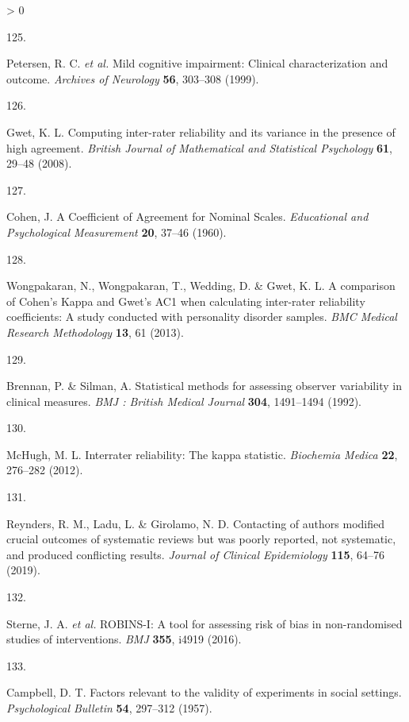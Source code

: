 \documentclass[a4paper, twoside]{templates/ociamthesis}
\newlength{\cslhangindent}
\newlength{\csllabelwidth}
\newenvironment{CSLReferences}[3] %
 {%
  \setlength{\parindent}{0pt}
  \ifodd #1 \everypar{\setlength{\hangindent}{\cslhangindent}}\ignorespaces\fi
  \ifnum #2 > 0
  \setlength{\parskip}{#2\baselineskip}
  \fi
 }%
 {}
\newcommand{\CSLLeftMargin}[1]{\parbox[t]{\maxof{\widthof{#1}}{\csllabelwidth}}{#1}}
\newcommand{\CSLRightInline}[1]{\parbox[t]{\linewidth - \csllabelwidth}{#1}}
\begin{document}
\begin{CSLReferences}{0}{0}
\leavevmode\hypertarget{ref-petersen1999}{}%
\CSLLeftMargin{125. }
\CSLRightInline{Petersen, R. C. \emph{et al.} Mild cognitive impairment: Clinical characterization and outcome. \emph{Archives of Neurology} \textbf{56}, 303--308 (1999).}

\leavevmode\hypertarget{ref-gwet2008}{}%
\CSLLeftMargin{126. }
\CSLRightInline{Gwet, K. L. Computing inter-rater reliability and its variance in the presence of high agreement. \emph{British Journal of Mathematical and Statistical Psychology} \textbf{61}, 29--48 (2008).}

\leavevmode\hypertarget{ref-cohen1960}{}%
\CSLLeftMargin{127. }
\CSLRightInline{Cohen, J. A {Coefficient} of {Agreement} for {Nominal Scales}. \emph{Educational and Psychological Measurement} \textbf{20}, 37--46 (1960).}

\leavevmode\hypertarget{ref-wongpakaran2013}{}%
\CSLLeftMargin{128. }
\CSLRightInline{Wongpakaran, N., Wongpakaran, T., Wedding, D. \& Gwet, K. L. A comparison of {Cohen}'s {Kappa} and {Gwet}'s {AC1} when calculating inter-rater reliability coefficients: A study conducted with personality disorder samples. \emph{BMC Medical Research Methodology} \textbf{13}, 61 (2013).}

\leavevmode\hypertarget{ref-brennan1992}{}%
\CSLLeftMargin{129. }
\CSLRightInline{Brennan, P. \& Silman, A. Statistical methods for assessing observer variability in clinical measures. \emph{BMJ : British Medical Journal} \textbf{304}, 1491--1494 (1992).}

\leavevmode\hypertarget{ref-mchugh2012}{}%
\CSLLeftMargin{130. }
\CSLRightInline{McHugh, M. L. Interrater reliability: The kappa statistic. \emph{Biochemia Medica} \textbf{22}, 276--282 (2012).}

\leavevmode\hypertarget{ref-reynders2019}{}%
\CSLLeftMargin{131. }
\CSLRightInline{Reynders, R. M., Ladu, L. \& Girolamo, N. D. Contacting of authors modified crucial outcomes of systematic reviews but was poorly reported, not systematic, and produced conflicting results. \emph{Journal of Clinical Epidemiology} \textbf{115}, 64--76 (2019).}

\leavevmode\hypertarget{ref-sterne2016}{}%
\CSLLeftMargin{132. }
\CSLRightInline{Sterne, J. A. \emph{et al.} {ROBINS}-{I}: A tool for assessing risk of bias in non-randomised studies of interventions. \emph{BMJ} \textbf{355}, i4919 (2016).}

\leavevmode\hypertarget{ref-campbell1957}{}%
\CSLLeftMargin{133. }
\CSLRightInline{Campbell, D. T. Factors relevant to the validity of experiments in social settings. \emph{Psychological Bulletin} \textbf{54}, 297--312 (1957).}


\end{CSLReferences}
\end{document}
